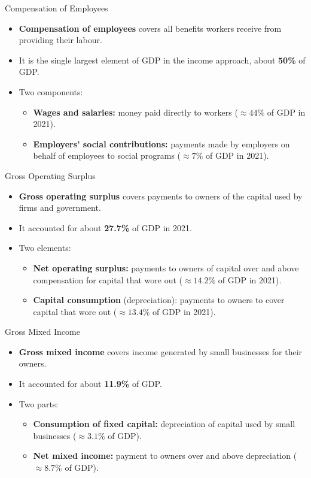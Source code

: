 \documentclass[aspectratio=169]{beamer}
\begin{document}
\begin{frame}{Compensation of Employees}
\transfade
\begin{itemize}
  \item \textbf{Compensation of employees} covers all benefits workers receive from providing their labour.
  \item It is the \alert{single largest} element of GDP in the income approach, about \textbf{50\%} of GDP.
  \item Two components:
  \begin{itemize}
    \item \textbf{Wages and salaries:} money paid directly to workers (\(\approx 44\%\) of GDP in 2021).
    \item \textbf{Employers' social contributions:} payments made by employers on behalf of employees to social programs (\(\approx 7\%\) of GDP in 2021).
  \end{itemize}
\end{itemize}
\end{frame}

\begin{frame}{Gross Operating Surplus}
\transfade
\begin{itemize}
  \item \textbf{Gross operating surplus} covers payments to owners of the \alert{capital} used by firms and government.
  \item It accounted for about \textbf{27.7\%} of GDP in 2021.
  \item Two elements:
  \begin{itemize}
    \item \textbf{Net operating surplus:} payments to owners of capital over and above compensation for capital that wore out (\(\approx 14.2\%\) of GDP in 2021).
    \item \textbf{Capital consumption} (depreciation): payments to owners to cover capital that wore out (\(\approx 13.4\%\) of GDP in 2021).
  \end{itemize}
\end{itemize}
\end{frame}

\begin{frame}{Gross Mixed Income}
\transfade
\begin{itemize}
  \item \textbf{Gross mixed income} covers income generated by small businesses for their owners.
  \item It accounted for about \textbf{11.9\%} of GDP.
  \item Two parts:
  \begin{itemize}
    \item \textbf{Consumption of fixed capital:} depreciation of capital used by small businesses (\(\approx 3.1\%\) of GDP).
    \item \textbf{Net mixed income:} payment to owners over and above depreciation (\(\approx 8.7\%\) of GDP).
  \end{itemize}
\end{itemize}
\end{frame}
\end{document}
